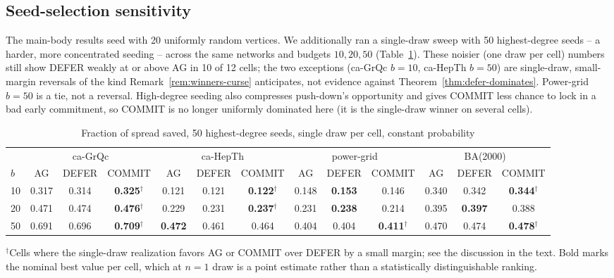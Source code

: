 \documentclass[ASNA,number]{USG}
\newcommand{\up}{\rule{0pt}{2.6ex}}
\newcommand{\down}{\rule[-1.2ex]{0pt}{0pt}}
\begin{document}
\subsection{Seed-selection sensitivity}

The main-body results seed with 20 uniformly random vertices. We
additionally ran a single-draw sweep with 50 highest-degree seeds -- a
harder, more concentrated seeding -- across the same networks and budgets
$10,20,50$ (Table~\ref{tab:defer-degree-seeds}). These noisier (one draw
per cell) numbers still show DEFER weakly at or above AG in 10 of 12
cells; the two exceptions (ca-GrQc $b=10$, ca-HepTh $b=50$) are
single-draw, small-margin reversals of the kind
Remark~\ref{rem:winners-curse} anticipates, not evidence against
Theorem~\ref{thm:defer-dominates}. Power-grid $b=50$ is a tie, not a
reversal. High-degree seeding also compresses push-down's opportunity and
gives COMMIT less chance to lock in a bad early commitment, so COMMIT is
no longer uniformly dominated here (it is the single-draw winner on
several cells).

\begin{table}[h]
\centering
\caption{Fraction of spread saved, 50 highest-degree seeds, single draw per cell, constant probability\label{tab:defer-degree-seeds}}
\begin{tabular}{@{}lcccccccccccc@{}}
\hline
\up & \multicolumn{3}{c}{ca-GrQc} & \multicolumn{3}{c}{ca-HepTh} & \multicolumn{3}{c}{power-grid} & \multicolumn{3}{c}{BA(2000)} \\
$b$ & AG & DEFER & COMMIT & AG & DEFER & COMMIT & AG & DEFER & COMMIT & AG & DEFER & COMMIT \\
\hline
\up 10 & 0.317 & 0.314 & \textbf{0.325}$^\dagger$ & 0.121 & 0.121 & \textbf{0.122}$^\dagger$ & 0.148 & \textbf{0.153} & 0.146 & 0.340 & 0.342 & \textbf{0.344}$^\dagger$ \\
20 & 0.471 & 0.474 & \textbf{0.476}$^\dagger$ & 0.229 & 0.231 & \textbf{0.237}$^\dagger$ & 0.231 & \textbf{0.238} & 0.214 & 0.395 & \textbf{0.397} & 0.388 \\
\down 50 & 0.691 & 0.696 & \textbf{0.709}$^\dagger$ & \textbf{0.472} & 0.461 & 0.464 & 0.404 & 0.404 & \textbf{0.411}$^\dagger$ & 0.470 & 0.474 & \textbf{0.478}$^\dagger$ \\
\hline
\end{tabular}
$^\dagger$Cells where the single-draw realization favors AG or COMMIT
over DEFER by a small margin; see the discussion in the text. Bold marks
the nominal best value per cell, which at $n=1$ draw is a point estimate
rather than a statistically distinguishable ranking.
\end{table}
\end{document}
